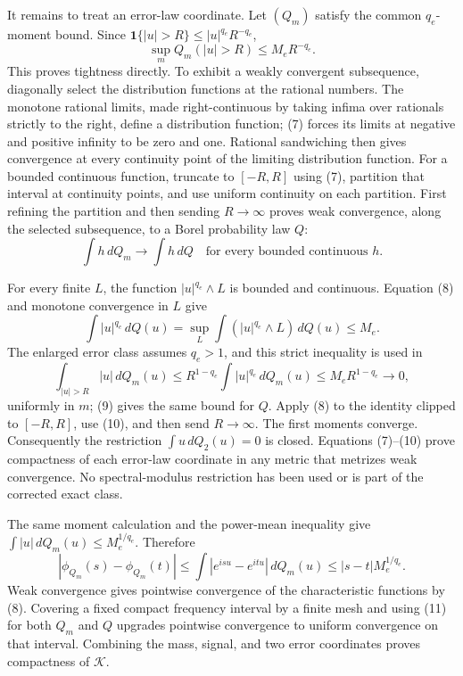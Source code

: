 It remains to treat an error-law coordinate.  Let \((Q_m)\) satisfy the
common \(q_e\)-moment bound.  Since
\(\mathbf 1\{|u|>R\}\le |u|^{q_e}R^{-q_e}\),
\[
 \sup_m Q_m(|u|>R)\le M_eR^{-q_e}.                                 \tag{7}
\]
This proves tightness directly.  To exhibit a weakly convergent subsequence,
diagonally select the distribution functions at the rational numbers.  The
monotone rational limits, made right-continuous by taking infima over rationals
strictly to the right, define a distribution function; (7) forces its limits
at negative and positive infinity to be zero and one.  Rational sandwiching
then gives convergence at every continuity point of the limiting distribution
function.  For a bounded continuous function, truncate to \([-R,R]\) using
(7), partition that interval at continuity points, and use uniform continuity
on each partition.  First refining the partition and then sending
\(R\to\infty\) proves weak convergence, along the selected subsequence, to a
Borel probability law \(Q\):
\[
 \int h\,dQ_m\longrightarrow\int h\,dQ
 \quad\text{for every bounded continuous }h.                      \tag{8}
\]

For every finite \(L\), the function \(|u|^{q_e}\wedge L\) is bounded and
continuous.  Equation (8) and monotone convergence in \(L\) give
\[
 \int |u|^{q_e}\,dQ(u)
 =\sup_L\int(|u|^{q_e}\wedge L)\,dQ(u)\le M_e.                   \tag{9}
\]
The enlarged error class assumes \(q_e>1\), and this strict inequality is
used in
\[
 \int_{|u|>R}|u|\,dQ_m(u)
 \le R^{1-q_e}\int|u|^{q_e}\,dQ_m(u)
 \le M_eR^{1-q_e}\longrightarrow0,                               \tag{10}
\]
uniformly in \(m\); (9) gives the same bound for \(Q\).  Apply (8) to the
identity clipped to \([-R,R]\), use (10), and then send \(R\to\infty\).
The first moments converge.  Consequently the restriction
\(\int u\,dQ_2(u)=0\) is closed.  Equations (7)--(10) prove compactness of
each error-law coordinate in any metric that metrizes weak convergence.  No
spectral-modulus restriction has been used or is part of the corrected exact
class.

The same moment calculation and the power-mean inequality give
\(\int|u|\,dQ_m(u)\le M_e^{1/q_e}\).  Therefore
\[
 |\phi_{Q_m}(s)-\phi_{Q_m}(t)|
 \le\int|e^{isu}-e^{itu}|\,dQ_m(u)
 \le |s-t|M_e^{1/q_e}.                                            \tag{11}
\]
Weak convergence gives pointwise convergence of the characteristic functions
by (8).  Covering a fixed compact frequency interval by a finite mesh and
using (11) for both \(Q_m\) and \(Q\) upgrades pointwise convergence to
uniform convergence on that interval.  Combining the mass, signal, and two
error coordinates proves compactness of \(\mathscr K\).

